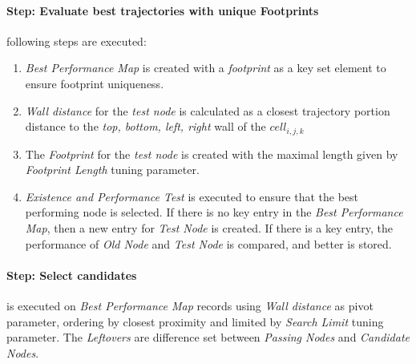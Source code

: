 \paragraph{Step: Evaluate best trajectories with unique Footprints} following steps are executed:
\begin{enumerate}
    \item \emph{Best Performance Map} is created with a \emph{footprint} as a key set element to ensure footprint uniqueness.
    
    \item \emph{Wall distance} for the \emph{test node} is calculated as a closest trajectory portion distance to the \emph{top, bottom, left, right} wall of the $cell_{i,j,k}$
    
    \item The \emph{Footprint} for the \emph{test node} is created with the  maximal length given by \emph{Footprint Length} tuning parameter.
    
    \item \emph{Existence and Performance Test} is executed to ensure that the best performing node is selected. If there is no key entry in the \emph{Best Performance Map}, then a new entry for \emph{Test Node} is created. If there is a key entry, the performance of \emph{Old Node} and \emph{Test Node} is compared, and better is stored.
\end{enumerate}

\paragraph{Step: Select candidates} is executed on \emph{Best Performance Map} records using  \emph{Wall distance} as pivot parameter, ordering by closest proximity and limited by \emph{Search Limit} tuning parameter. The \emph{Leftovers} are difference set between \emph{Passing Nodes} and \emph{Candidate Nodes}. 


